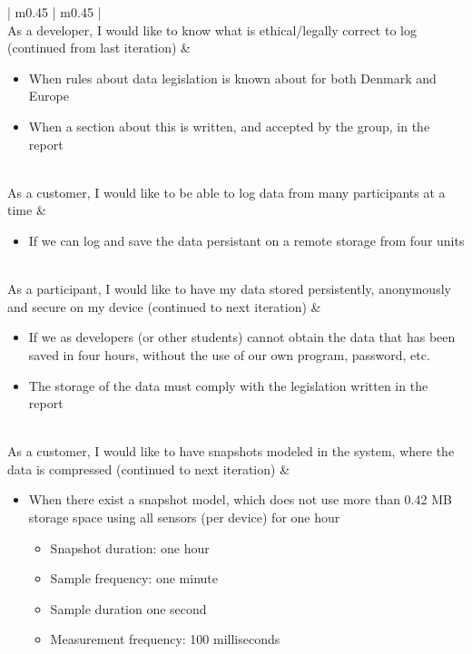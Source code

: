 \begin{center}
\begin{longtable}{| m{} | m{} |}
	 \\ \hline
	As a developer, I would like to know what is ethical/legally correct to log (continued from last iteration) & 
	\begin{itemize}[noitemsep,topsep=0pt,parsep=0pt,partopsep=0pt]
		\item When rules about data legislation is known about for both Denmark and Europe
		\item When a section about this is written, and accepted by the group, in the report
	\end{itemize} \\ \hline
	As a customer, I would like to be able to log data from many participants at a time & 
	\begin{itemize}[noitemsep,topsep=0pt,parsep=0pt,partopsep=0pt]
	 	\item If we can log and save the data persistant on a remote storage from four units
	 \end{itemize} \\ \hline
	As a participant, I would like to have my data stored persistently, anonymously and secure on my device (continued to next iteration) & 
	\begin{itemize}[noitemsep,topsep=0pt,parsep=0pt,partopsep=0pt]
	 	\item If we as developers (or other students) cannot obtain the data that has been saved in four hours, without the use of our own program, password, etc.
	 	\item The storage of the data must comply with the legislation written in the report
	 \end{itemize} \\ \hline
	As a customer, I would like to have snapshots modeled in the system, where the data is compressed (continued to next iteration) & 
	\begin{itemize}[noitemsep,topsep=0pt,parsep=0pt,partopsep=0pt]
		\item When there exist a snapshot model, which does not use more than 0.42 MB storage space using all sensors (per device) for one hour
			\begin{itemize}[noitemsep,topsep=0pt,parsep=0pt,partopsep=0pt]
				\item Snapshot duration: one hour
				\item Sample frequency: one minute
				\item Sample duration one second
				\item Measurement frequency: 100 milliseconds
			\end{itemize}
	 \end{itemize} \\ \hline


\end{longtable}
\end{center}
